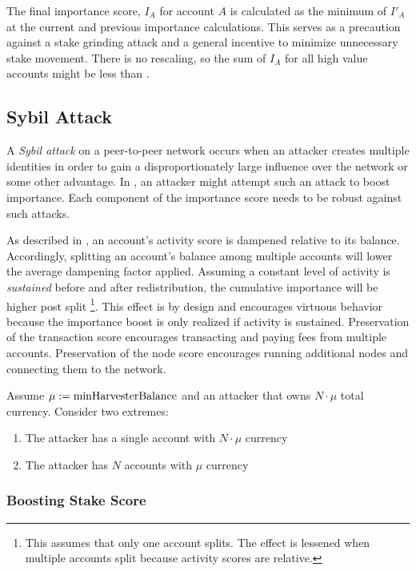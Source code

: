 The final importance score, $I_A$ for account $A$ is calculated as the minimum of $I'_A$ at the current and previous importance calculations.
This serves as a precaution against a stake grinding attack and a general incentive to minimize unnecessary stake movement.
There is no rescaling, so the sum of $I_A$ for all high value accounts might be less than .

\subsection{Sybil Attack}

A \emph{Sybil attack} on a peer-to-peer network occurs when an attacker creates multiple identities in order to gain a disproportionately large influence over the network or some other advantage.
In \codename, an attacker might attempt such an attack to boost importance.
Each component of the importance score needs to be robust against such attacks.

As described in , an account's activity score is dampened relative to its balance.
Accordingly, splitting an account's balance among multiple accounts will lower the average dampening factor applied.
Assuming a constant level of activity is \emph{sustained} before and after redistribution, the cumulative importance will be higher post split
\footnote{
	This assumes that only one account splits.
	The effect is lessened when multiple accounts split because activity scores are relative.
}.
This effect is by design and encourages virtuous behavior because the importance boost is only realized if activity is sustained.
Preservation of the transaction score encourages transacting and paying fees from multiple accounts.
Preservation of the node score encourages running additional nodes and connecting them to the network.

Assume $\mu := \nemsetting{network}{minHarvesterBalance}$ and an attacker that owns $N \cdot \mu$ total currency.
Consider two extremes:

\begin{enumerate}
	\item{The attacker has a single account with $N \cdot \mu$ currency}
	\item{The attacker has $N$ accounts with $\mu$ currency}
\end{enumerate}

\subsubsection*{Boosting Stake Score}

